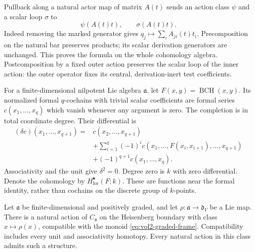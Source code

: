 Pullback along a natural actor map of matrix $A(t)$ sends
an action class $\psi$ and a scalar loop $\sigma$ to
\begin{equation}\label{eq:vol2-class-substitution}
 \psi(A(t)t),\qquad \sigma(A(t)t).
\end{equation}
Indeed removing the marked generator gives $q_j\mapsto
\sum_iA_{ji}(t)t_i$. Precomposition on the natural bar
preserves products; its scalar derivation generators are
unchanged. This proves the formula on the whole cohomology
algebra. Postcomposition by a fixed outer action preserves
the scalar loop of the inner action: the outer operator
fixes its central, derivation-inert test coefficients.

For a finite-dimensional nilpotent Lie algebra $\mathfrak a$,
let $F(x,y)=\operatorname{BCH}(x,y)$. Its normalized formal
$q$-cochains with trivial scalar coefficients are formal series
$c(x_1,\ldots,x_q)$ which vanish whenever any argument is zero.
The completion is in total coordinate degree. Their differential is
\begin{equation}\label{eq:vol2-formal-group-differential}
\begin{aligned}
 (\delta c)(x_1,\ldots,x_{q+1})
 ={}&c(x_2,\ldots,x_{q+1})\\
 &+\sum_{i=1}^{q}(-1)^i
 c(x_1,\ldots,F(x_i,x_{i+1}),\ldots,x_{q+1})\\
 &+(-1)^{q+1}c(x_1,\ldots,x_q).
\end{aligned}
\end{equation}
Associativity and the unit give $\delta^2=0$. Degree zero is
$k$ with zero differential. Denote the cohomology by
$H^\bullet_{\mathrm{for}}(F;k)$. These are functions near the
formal identity, rather than cochains on the discrete group of
$k$-points.

\begin{theorem}\label{thm:vol2-graded-multiplicative-action}
Let $\mathfrak a$ be finite-dimensional and positively graded,
and let $\rho:\mathfrak a\to\mathfrak d_V$ be a Lie map.
There is a natural action of $C_{\mathfrak a}$ on the
Heisenberg boundary with class $x\mapsto\rho(x)$, compatible
with the monoid \eqref{eq:vol2-graded-frame}. Compatibility
includes every unit and associativity homotopy. Every natural
action in this class admits such a structure.
\end{theorem}


